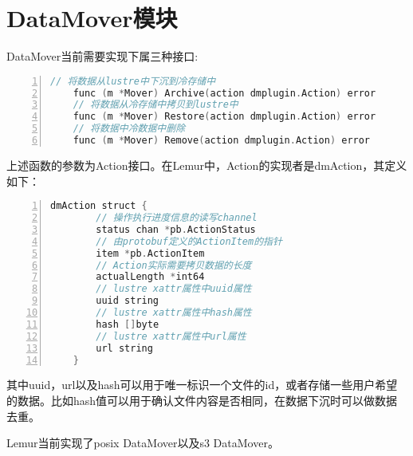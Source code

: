 \section{DataMover模块}

DataMover当前需要实现下属三种接口:

\begin{lstlisting}[language={c++},numbers=left]
    // 将数据从lustre中下沉到冷存储中 
    func (m *Mover) Archive(action dmplugin.Action) error  
    // 将数据从冷存储中拷贝到lustre中 
    func (m *Mover) Restore(action dmplugin.Action) error  
    // 将数据中冷数据中删除 
    func (m *Mover) Remove(action dmplugin.Action) error  
\end{lstlisting}


上述函数的参数为Action接口。在Lemur中，Action的实现者是dmAction，其定义如下： 
\begin{lstlisting}[language={c++},numbers=left]
    dmAction struct {
        // 操作执行进度信息的读写channel
        status chan *pb.ActionStatus    
        // 由protobuf定义的ActionItem的指针
        item *pb.ActionItem                 
        // Action实际需要拷贝数据的长度
        actualLength *int64                 
        // lustre xattr属性中uuid属性
        uuid string                                 
        // lustre xattr属性中hash属性
        hash []byte                                 
        // lustre xattr属性中url属性
        url string                                 
    } 
\end{lstlisting}

其中uuid，url以及hash可以用于唯一标识一个文件的id，或者存储一些用户希望的数据。比如hash值可以用于确认文件内容是否相同，在数据下沉时可以做数据去重。 

Lemur当前实现了posix DataMover以及s3 DataMover。 